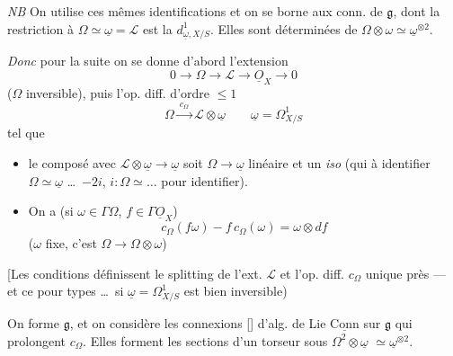 \documentclass[11pt,a4paper]{article}
\begin{document}
\emph{NB} On utilise   ces mêmes identifications et on se borne aux conn. de $\mathfrak{g}$, \struck{\ill{}} dont la restriction à $\Omega \simeq \underline{\omega} = \mathcal{L}$ est la $d^1_{\underline{\omega},X/S}$. Elles sont déterminées      de $\Omega\otimes\omega \simeq \underline{\omega}^{\otimes 2}$.

\emph{Donc} pour la suite on se donne d'abord l'extension
\[
0 \to \Omega \to \mathcal{L} \to \underline{O}_X \to 0
\]
($\Omega$ inversible), puis l'op. diff. d'ordre $\leq 1$
\[
\Omega \xrightarrow{\ c_{\Omega}\ } \mathcal{L}\otimes\underline{\omega} \qquad \underline{\omega} = \Omega^1_{X/S}
\]
tel que
\begin{itemize}
\item[a)] le composé avec $\mathcal{L}\otimes\underline{\omega} \to \underline{\omega}$ soit 
$\Omega \to \underline{\omega}$ linéaire et un \emph{iso} (qui  à identifier $\Omega \simeq \underline{\omega}$    \ldots\ $-2i$, $i : \Omega \simeq \ldots$ pour identifier).
\item[b)] \struck{\ill{}} On a (si $\omega\in\Gamma\Omega$, $f\in\Gamma\underline{O}_X$)
\[
c_{\Omega}(f\omega) - f\,c_{\Omega}(\omega) = \omega\otimes df
\]
($\omega$ fixe, c'est   $\Omega \to \Omega\otimes\omega$)
\end{itemize}

[Les conditions définissent le splitting de l'ext. $\mathcal{L}$ et l'op. diff. $c_{\Omega}$  unique près --- et ce pour types \ill{} \ldots\ si $\underline{\omega} = \Omega^1_{X/S}$ est bien inversible)

On forme $\mathfrak{g}$, et on considère les connexions [] d'alg. de Lie $\underline{\mathrm{Conn}}$ sur $\mathfrak{g}$ qui prolongent $c_{\Omega}$. Elles forment les sections d'un torseur sous $\Omega^2\otimes\underline{\omega}$ $\simeq \underline{\omega}^{\otimes 2}$. 

\end{document}
